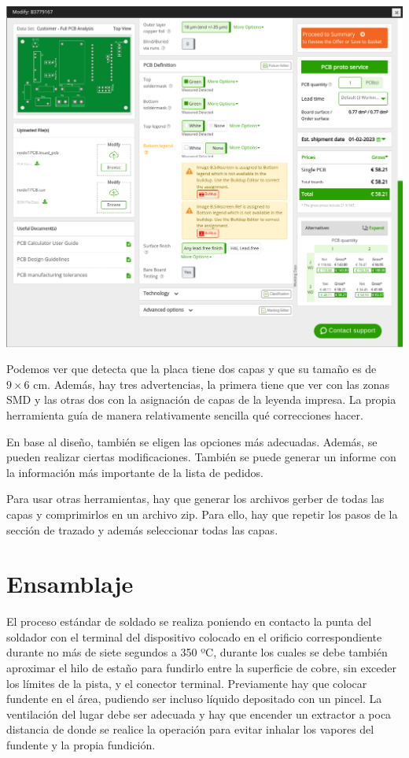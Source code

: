 \includegraphics[width=\linewidth]{eurocircuits-pcb-viewer-2.png}

Podemos ver que detecta que la placa tiene dos capas y que su tamaño es de
$9 \times 6$ cm. Además, hay tres advertencias, la primera tiene que ver con
las zonas SMD y las otras dos con la asignación de capas de la leyenda impresa.
La propia herramienta guía de manera relativamente sencilla qué correcciones
hacer.

En base al diseño, también se eligen las opciones más adecuadas. Además, se
pueden realizar ciertas modificaciones. También se puede generar un informe con
la información más importante de la lista de pedidos.

Para usar otras herramientas, hay que generar los archivos gerber de todas las
capas y comprimirlos en un archivo zip. Para ello, hay que repetir los pasos de
la sección de trazado y además seleccionar todas las capas.

\section{Ensamblaje}

El proceso estándar de soldado se realiza poniendo en contacto la punta del
soldador con el terminal del dispositivo colocado en el orificio
correspondiente durante no más de siete segundos a 350 ºC, durante los cuales
se debe también aproximar el hilo de estaño para fundirlo entre la superficie
de cobre, sin exceder los límites de la pista, y el conector terminal.
Previamente hay que colocar fundente en el área, pudiendo ser incluso líquido
depositado con un pincel. La ventilación del lugar debe ser adecuada y hay que
encender un extractor a poca distancia de donde se realice la operación para
evitar inhalar los vapores del fundente y la propia fundición.

